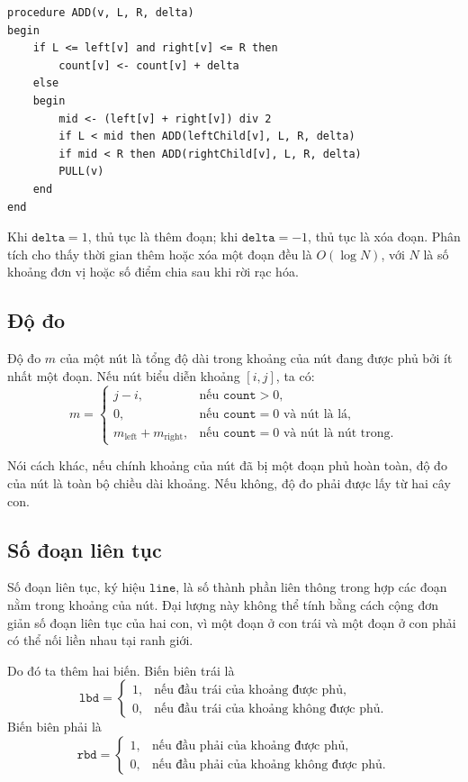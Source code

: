 \documentclass[11pt]{article}
\begin{document}
\begin{verbatim}
procedure ADD(v, L, R, delta)
begin
    if L <= left[v] and right[v] <= R then
        count[v] <- count[v] + delta
    else
    begin
        mid <- (left[v] + right[v]) div 2
        if L < mid then ADD(leftChild[v], L, R, delta)
        if mid < R then ADD(rightChild[v], L, R, delta)
        PULL(v)
    end
end
\end{verbatim}

Khi \(\texttt{delta}=1\), thủ tục là thêm đoạn; khi \(\texttt{delta}=-1\),
thủ tục là xóa đoạn. Phân tích cho thấy thời gian thêm hoặc xóa một đoạn đều
là \(O(\log N)\), với \(N\) là số khoảng đơn vị hoặc số điểm chia sau khi rời
rạc hóa.

\subsection{Độ đo}

Độ đo \(m\) của một nút là tổng độ dài trong khoảng của nút đang được phủ bởi
ít nhất một đoạn. Nếu nút biểu diễn khoảng \([i,j]\), ta có:
\[
m =
\begin{cases}
  j-i, & \text{nếu } \texttt{count}>0,\\
  0, & \text{nếu } \texttt{count}=0 \text{ và nút là lá},\\
  m_{\mathrm{left}}+m_{\mathrm{right}},
    & \text{nếu } \texttt{count}=0 \text{ và nút là nút trong}.
\end{cases}
\]

Nói cách khác, nếu chính khoảng của nút đã bị một đoạn phủ hoàn toàn, độ đo
của nút là toàn bộ chiều dài khoảng. Nếu không, độ đo phải được lấy từ hai
cây con.

\subsection{Số đoạn liên tục}

Số đoạn liên tục, ký hiệu \(\texttt{line}\), là số thành phần liên thông trong
hợp các đoạn nằm trong khoảng của nút. Đại lượng này không thể tính bằng cách
cộng đơn giản số đoạn liên tục của hai con, vì một đoạn ở con trái và một
đoạn ở con phải có thể nối liền nhau tại ranh giới.

Do đó ta thêm hai biến. Biến biên trái là
\[
\texttt{lbd}=
\begin{cases}
1, & \text{nếu đầu trái của khoảng được phủ},\\
0, & \text{nếu đầu trái của khoảng không được phủ}.
\end{cases}
\]
Biến biên phải là
\[
\texttt{rbd}=
\begin{cases}
1, & \text{nếu đầu phải của khoảng được phủ},\\
0, & \text{nếu đầu phải của khoảng không được phủ}.
\end{cases}
\]
\end{document}
